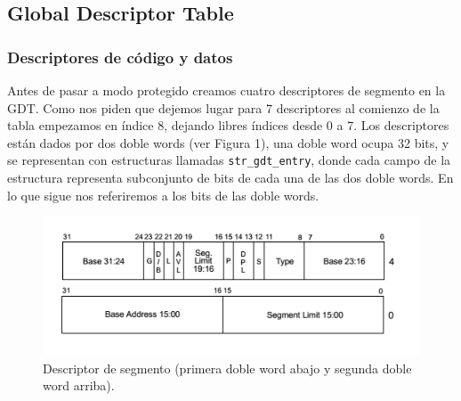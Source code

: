 \subsection{Global Descriptor Table}
\subsubsection{Descriptores de código y datos}
Antes de pasar a modo protegido creamos cuatro descriptores de segmento en la GDT. Como nos piden que dejemos lugar para 7 descriptores al comienzo de la tabla empezamos en índice 8, dejando libres índices desde 0 a 7.
Los descriptores están dados por dos doble words (ver Figura 1), una doble word ocupa 32 bits, y se representan con estructuras llamadas \verb|str_gdt_entry|, donde cada campo de la estructura representa subconjunto de bits de cada una de las dos doble words. En lo que sigue nos referiremos a los bits de las doble words.\\
\begin{figure}[h]
\centering
\includegraphics[scale=0.6] {descriptor_segmento}
\caption{Descriptor de segmento (primera doble word abajo y segunda doble word arriba).}
\end{figure} 

